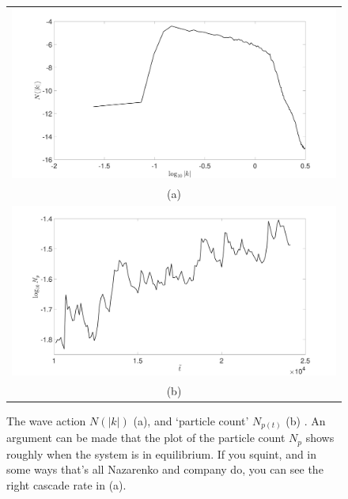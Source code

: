 \documentclass[a4paper,11pt]{article}
\begin{document}
\begin{figure}[!h]
\centering
\begin{tabular}{c}
\includegraphics[width=.7\textwidth]{action_cascade_K_128_Lx_128_tf_1pt5e4} \\ 
(a) \\
\includegraphics[width=.7\textwidth]{np_count_K_128_Lx_128_tf_1pt5e4}\\
(b)
\end{tabular}
\caption{The wave action $N(|k|)$ (a), and `particle count' $N_{p(t)}$ (b) .  An argument can be made that the plot of the particle count $N_{p}$ shows roughly when the system is in equilibrium. If you squint, and in some ways that's all Nazarenko and company do, you can see the right cascade rate in (a).}
\end{figure}
\end{document}
